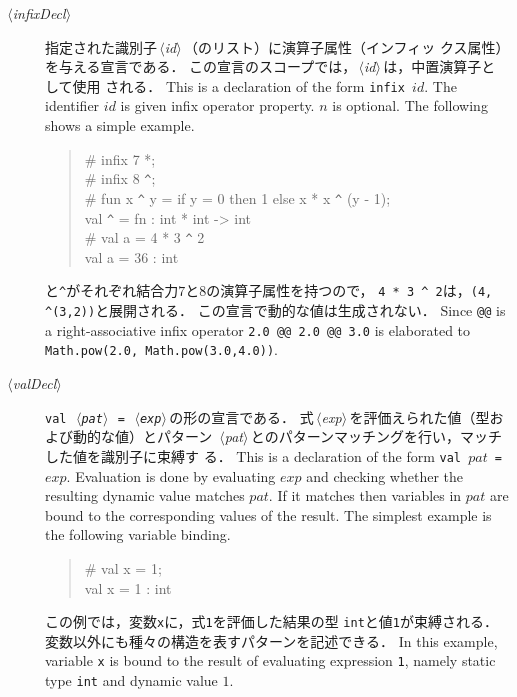 \documentclass{jbook}
\newcommand{\code}[1]{\mbox{\large\tt #1}}
\newcommand{\nonterm}[1]{\mbox{$\,\langle$}{\it #1}\mbox{$\rangle\,$}}
\newenvironment{program}{\begin{quote}\begin{tt}}%
                        {\end{tt}\end{quote}}
\begin{document}
\begin{description}
\item[\nonterm{infixDecl}] 
\ifjp%
	指定された識別子\nonterm{id}（のリスト）に演算子属性（インフィッ
クス属性）を与える宣言である．
	この宣言のスコープでは，\nonterm{id}は，中置演算子として使用
される．
\else%
	This is a declaration of the form \code{infix $id$}.
	The identifier $id$ is given infix operator property.
	$n$ is optional.
	The following shows a simple example.
\fi%
\begin{program}
  \# infix 7 *;\\
  \# infix 8 \verb|^|;\\
  \# fun x \verb|^| y = if y = 0 then 1 else x * x \verb|^| (y - 1);\\
  val \verb|^| = fn : int * int -> int\\
  \# val a = 4 * 3 \verb|^| 2\\
  val a = 36 : int
\end{program}
\ifjp%
	\code{*}と\verb|^|がそれぞれ結合力$7$と$8$の演算子属性を持つので， 
\code{4 * 3 }\verb|^|\code{ 2}は，\code{*(4, }\verb|^|\code{(3,2))}と展開される．
	この宣言で動的な値は生成されない．
\else%
	Since \code{@@} is a right-associative infix operator
\code{2.0 @@ 2.0 @@ 3.0} is elaborated to \code{Math.pow(2.0,
Math.pow(3.0,4.0))}.
\fi%

\item[\nonterm{valDecl}] 
\ifjp%
	\code{val \nonterm{pat} = \nonterm{exp}}の形の宣言である．
	式\nonterm{exp}を評価えられた値（型および動的な値）とパターン
\nonterm{pat}とのパターンマッチングを行い，マッチした値を識別子に束縛す
る．
\else%
	This is a declaration of the form \code{val $pat$ = $exp$}.
	Evaluation is done by evaluating $exp$ and checking whether the
resulting dynamic value matches $pat$.
	If it matches then variables in $pat$ are bound to the
corresponding values of the result.
	The simplest example is the following variable binding.
\fi%
\begin{program}
  \# val x = 1;\\
  val x = 1 : int
\end{program}
\ifjp%
	この例では，変数\code{x}に，式\code{1}を評価した結果の型
\code{int}と値\code{1}が束縛される．
	変数以外にも種々の構造を表すパターンを記述できる．
\else%
	In this example, variable \code{x} is bound to the result of
evaluating expression \code{1}, namely static type \code{int} and
dynamic value $1$.
\fi%


\end{description}
\end{document}
